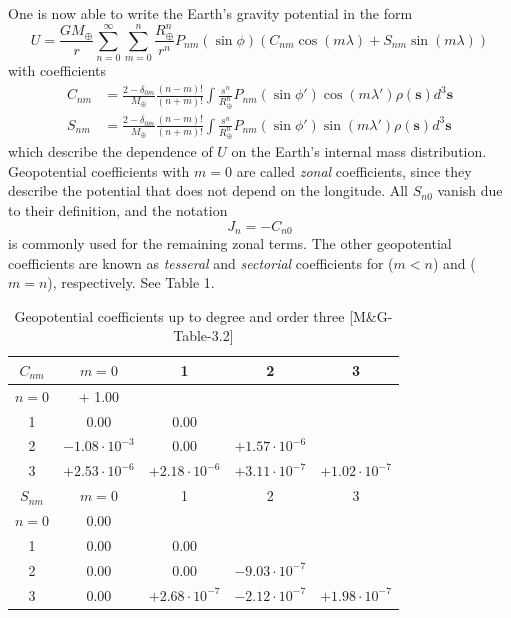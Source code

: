 \documentclass[11pt]{article}
\begin{document}
One is now able to write the Earth's gravity potential in the form
\begin{equation}
  U = \frac{GM_{\oplus}}{r}\sum_{n = 0}^{\infty}\sum_{m = 0}^n
  \frac{R_{\oplus}^n}{r^n}P_{nm}(\sin\phi)(C_{nm}\cos(m\lambda)
  + S_{nm}\sin(m\lambda)) \label{3.10}\tag{3.10}
\end{equation}
with coefficients
\begin{align}
  C_{nm} &= \frac{2 - \delta_{0m}}{M_{\oplus}}\frac{(n - m)!}{(n + m)!}
  \int\frac{s^n}{R_{\oplus}^n}P_{nm}(\sin\phi')
  \cos(m\lambda')\rho(\boldsymbol{s})d^3\boldsymbol{s} \nonumber \\
  S_{nm} &= \frac{2 - \delta_{0m}}{M_{\oplus}}\frac{(n - m)!}{(n + m)!}
  \int\frac{s^n}{R_{\oplus}^n}P_{nm}(\sin\phi')
  \sin(m\lambda')\rho(\boldsymbol{s})d^3\boldsymbol{s} \label{3.11}\tag{3.11}
\end{align}
which describe the dependence of $U$ on the Earth's internal mass
distribution. Geopotential coefficients with $m = 0$ are called {\em
  zonal} coefficients, since they describe the potential that does not
depend on the longitude. All $S_{n0}$ vanish due to their definition,
and the notation
\begin{equation}
  J_n = -C_{n0} \label{3.12}\tag{3.12}
\end{equation}
is commonly used for the remaining zonal terms. The other geopotential
coefficients are known as {\em tesseral} and {\em sectorial}
coefficients for ($m < n$) and ($m = n$), respectively. See Table 1.

\begin{table}
  \caption{Geopotential coefficients up to degree and order three [M\&G-Table-3.2]}
  \begin{center}
    \begin{tabular}{|c|cccc|}
      \hline
      $C_{nm}$ & $m = 0$ & 1 & 2 & 3 \\
      \hline
      $n = 0$ & + 1.00 & & & \\
      1 & 0.00 & 0.00 & & \\
      2 & $-1.08\cdot 10^{-3}$ & 0.00 & $+1.57\cdot 10^{-6}$ & \\
      3 & $+2.53\cdot 10^{-6}$ & $+2.18\cdot 10^{-6}$ & $+3.11\cdot 10^{-7}$ & $+1.02\cdot 10^{-7}$ \\
      \hline
      $S_{nm}$ & $m = 0$ & 1 & 2 & 3 \\
      \hline
      $n = 0$ & 0.00 & & & \\
      1 & 0.00 & 0.00 & & \\
      2 & 0.00 & 0.00 & $-9.03\cdot 10^{-7}$ & \\
      3 & 0.00 & $+2.68\cdot 10^{-7}$ & $-2.12\cdot 10^{-7}$ & $+1.98\cdot 10^{-7}$ \\
      \hline
    \end{tabular}
  \end{center}
\end{table}
\end{document}
